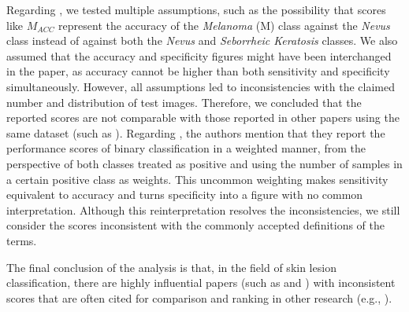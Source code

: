 \documentclass[3p, times]{elsarticle}
\begin{document}
Regarding \cite{skin7}, we tested multiple assumptions, such as the possibility that scores like $M_{ACC}$ represent the accuracy of the \emph{Melanoma} (M) class against the \emph{Nevus} class instead of against both the \emph{Nevus} and \emph{Seborrheic Keratosis} classes. We also assumed that the accuracy and specificity figures might have been interchanged in the paper, as accuracy cannot be higher than both sensitivity and specificity simultaneously. However, all assumptions led to inconsistencies with the claimed number and distribution of test images. Therefore, we concluded that the reported scores are not comparable with those reported in other papers using the same dataset (such as \cite{skin3}). Regarding \cite{skin9}, the authors mention that they report the performance scores of binary classification in a weighted manner, from the perspective of both classes treated as positive and using the number of samples in a certain positive class as weights. This uncommon weighting makes sensitivity equivalent to accuracy and turns specificity into a figure with no common interpretation. Although this reinterpretation resolves the inconsistencies, we still consider the scores inconsistent with the commonly accepted definitions of the terms.

The final conclusion of the analysis is that, in the field of skin lesion classification, there are highly influential papers (such as \cite{skin7} and \cite{skin9}) with inconsistent scores that are often cited for comparison and ranking in other research (e.g., \cite{skin7ref}).
\end{document}
